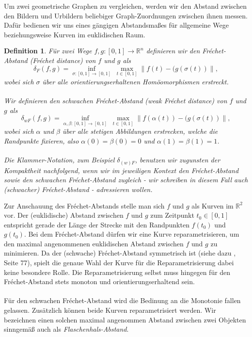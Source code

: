 \documentclass[a4paper, 12pt, twoside]{article}
\theoremstyle{Format1} %
\newtheorem{Def}{Definition}[section]       %
\begin{document}
	Um zwei geometrische Graphen zu vergleichen, werden wir den Abstand zwischen den Bildern und Urbildern beliebiger Graph-Zuordnungen zwischen ihnen
	messen. Dafür bedienen wir uns eines gängigen Abstandsmaßes für allgemeine Wege beziehungsweise Kurven im euklidischen Raum.

\begin{Def} \label{Definition Fréchet-Abstand}
	Für zwei Wege $ f, g: [0,1] \to \mathbb{R}^n $ definieren wir den \textit{Fréchet-Abstand (Fréchet distance)} von $f$ und $g$ als
	$$ \delta_F(f,g) =  \inf_{\sigma:[0,1] \to [0,1]} \; \max_{t \in [0,1]} \lVert f(t)-(g(\sigma(t)) \rVert, $$
	wobei sich $\sigma $ über alle orientierungserhaltenen Homöomorphismen erstreckt.
	\\
	\\
	Wir definieren den \textit{schwachen Fréchet-Abstand (weak Fréchet distance)} von $f$ und $g$ als
	$$\delta_{wF}(f,g) =\inf_{\alpha , \beta :[0,1] \to [0,1]} \; \max_{t \in [0,1]} \lVert f(\alpha(t))-(g(\sigma(t)) \rVert,$$
	wobei sich $\alpha$ und $\beta$ über alle stetigen Abbildungen erstrecken, welche die Randpunkte fixieren, also $\alpha(0) = \beta(0) = 0$
	und $\alpha(1) = \beta(1) = 1$.
	\\
	\\
	Die Klammer-Notation, zum Beispiel $ \delta_{(w)F} $, benutzen wir zugunsten der Kompaktheit nachfolgend, wenn wir im jeweiligen Kontext den Fréchet-Abstand sowie den schwachen Fréchet-Abstand zugleich -
	wir schreiben in diesem Fall auch \textit{(schwacher) Fréchet-Abstand} - adressieren wollen.
\end{Def}

Zur Anschauung des Fréchet-Abstands stelle man sich $f$ und $g$ als Kurven im $\mathbb{R}^2$ vor. Der (euklidische) Abstand zwischen $f$ und $g$ zum Zeitpunkt $t_0 \in [0,1]$ entspricht gerade der Länge der Strecke
mit den Randpunkten $f(t_0)$ und $g(t_0)$. Bei dem Fréchet-Abstand dürfen wir eine Kurve reparametrisieren, um den maximal angenommenen euklidischen Abstand zwischen $f$ und $g$ zu minimieren.
Da der (schwache) Fréchet-Abstand symmetrisch ist (siehe dazu \cite{Alt}, Seite 77), spielt die genaue Wahl der Kurve für die Reparametrisierung dabei keine besondere Rolle.
Die Reparametrisierung selbst muss hingegen für den Fréchet-Abstand stets monoton und orientierungserhaltend sein.
\\
\\
Für den schwachen Fréchet-Abstand wird die Bedinung an die Monotonie fallen gelassen. Zusätzlich können beide Kurven reparametrisiert werden.
Wir bezeichnen einen solchen maximal angenommen Abstand zwischen zwei Objekten sinngemäß auch als \textit{Flaschenhals-Abstand}.
\end{document}
